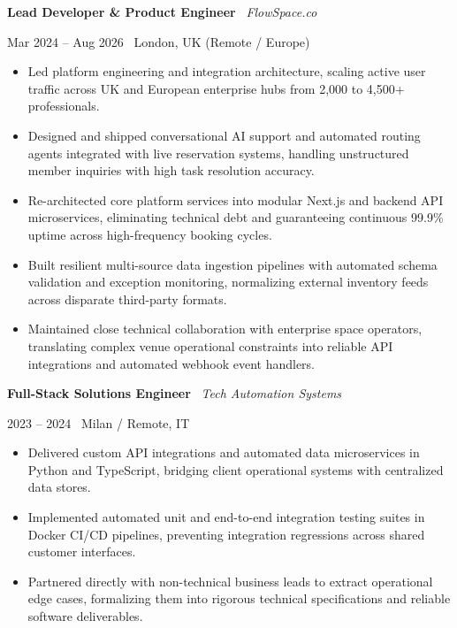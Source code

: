\documentclass[a4paper,10pt]{article}
\newcommand{\role}[4]{%
  \vspace{2pt}\noindent
  \begin{minipage}[t]{0.70\textwidth}\raggedright\textbf{#1} \textbullet\ \textit{#3}\end{minipage}%
  \hfill
  \begin{minipage}[t]{0.28\textwidth}\raggedleft\footnotesize\color{gray}#2 \textbullet\ #4\end{minipage}%
  \vspace{1pt}%
}
\begin{document}
\vspace{3pt}
\role{Lead Developer \& Product Engineer}{Mar 2024 -- Aug 2026}{FlowSpace.co}{London, UK (Remote / Europe)}
\begin{itemize}
  \item Led platform engineering and integration architecture, scaling active user traffic across UK and European enterprise hubs from 2,000 to 4,500+ professionals.
  \item Designed and shipped conversational AI support and automated routing agents integrated with live reservation systems, handling unstructured member inquiries with high task resolution accuracy.
  \item Re-architected core platform services into modular Next.js and backend API microservices, eliminating technical debt and guaranteeing continuous 99.9\% uptime across high-frequency booking cycles.
  \item Built resilient multi-source data ingestion pipelines with automated schema validation and exception monitoring, normalizing external inventory feeds across disparate third-party formats.
  \item Maintained close technical collaboration with enterprise space operators, translating complex venue operational constraints into reliable API integrations and automated webhook event handlers.
\end{itemize}

\vspace{3pt}
\role{Full-Stack Solutions Engineer}{2023 -- 2024}{Tech Automation Systems}{Milan / Remote, IT}
\begin{itemize}
  \item Delivered custom API integrations and automated data microservices in Python and TypeScript, bridging client operational systems with centralized data stores.
  \item Implemented automated unit and end-to-end integration testing suites in Docker CI/CD pipelines, preventing integration regressions across shared customer interfaces.
  \item Partnered directly with non-technical business leads to extract operational edge cases, formalizing them into rigorous technical specifications and reliable software deliverables.
\end{itemize}

\end{document}
